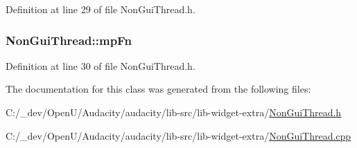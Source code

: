 Definition at line 29 of file Non\+Gui\+Thread.\+h.

\subsubsection[{\texorpdfstring{mp\+Fn}{mpFn}}]{ Non\+Gui\+Thread\+::mp\+Fn}\hypertarget{class_non_gui_thread_a827d68b0951ded4964a89a95de52d2f6}{}\label{class_non_gui_thread_a827d68b0951ded4964a89a95de52d2f6}


Definition at line 30 of file Non\+Gui\+Thread.\+h.



The documentation for this class was generated from the following files\+:\begin{DoxyCompactItemize}
\item 
C\+:/\+\_\+dev/\+Open\+U/\+Audacity/audacity/lib-\/src/lib-\/widget-\/extra/\hyperlink{_non_gui_thread_8h}{Non\+Gui\+Thread.\+h}\item 
C\+:/\+\_\+dev/\+Open\+U/\+Audacity/audacity/lib-\/src/lib-\/widget-\/extra/\hyperlink{_non_gui_thread_8cpp}{Non\+Gui\+Thread.\+cpp}\end{DoxyCompactItemize}
